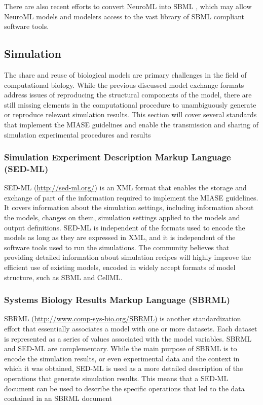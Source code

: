 There are also recent efforts to convert NeuroML into SBML
\autocite{keating2012encoding}, which may allow NeuroML models and
modelers access to the vast library of SBML compliant software tools.

\subsection{Simulation}

The share and reuse of biological models are primary challenges in the
field of computational biology. While the previous discussed model
exchange formats address issues of reproducing the structural components
of the model, there are still missing elements in the computational
procedure to unambiguously generate or reproduce relevant simulation
results. This section will cover several standards that implement the
MIASE guidelines and enable the transmission and sharing of simulation
experimental procedures and results

\subsubsection{Simulation Experiment Description Markup Language
(SED-ML)}

SED-ML (\url{http://sed-ml.org/}) \autocite{kohn2008sed} is an XML
format that enables the storage and exchange of part of the information
required to implement the MIASE guidelines. It covers information about
the simulation settings, including information about the models, changes
on them, simulation settings applied to the models and output
definitions. SED-ML is independent of the formats used to encode the
models as long as they are expressed in XML, and it is independent of
the software tools used to run the simulations. The community believes
that providing detailed information about simulation recipes will highly
improve the efficient use of existing models, encoded in widely accept
formats of model structure, such as SBML and CellML.

\subsubsection{Systems Biology Results Markup Language (SBRML)}

SBRML (\url{http://www.comp-sys-bio.org/SBRML}) \autocite{dada2010sbrml}
is another standardization effort that essentially associates a model
with one or more datasets. Each dataset is represented as a series of
values associated with the model variables. SBRML and SED-ML are
complementary. While the main purpose of SBRML is to encode the
simulation results, or even experimental data and the context in which
it was obtained, SED-ML is used as a more detailed description of the
operations that generate simulation results. This means that a SED-ML
document can be used to describe the specific operations that led to the
data contained in an SBRML document

